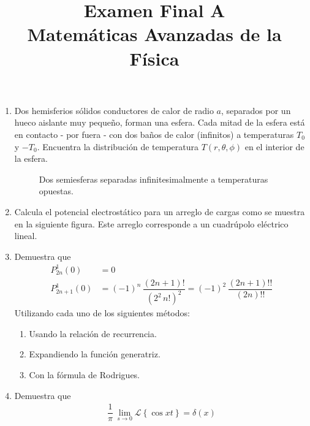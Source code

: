 
\author{}
\title{Examen Final A  \\ \large{Matemáticas Avanzadas de la Física}} \vspace{-1.5\baselineskip}
\date{ }

\vspace{-4cm}
\renewcommand\labelenumii{\theenumi.{\arabic{enumii})}}
\maketitle
\fontsize{14}{14}\selectfont
\begin{enumerate}
\item Dos hemisferios sólidos conductores de calor de radio $a$, separados por un hueco aislante muy pequeño, forman una esfera. Cada mitad de la esfera está en contacto - por fuera - con dos baños de calor (infinitos) a temperaturas $T_{0}$ y $-T_{0}$. Encuentra la distribución de temperatura $T (r, \theta, \phi)$ en el interior de la esfera.
\begin{figure}[H]
    \centering
    
    \caption{Dos semiesferas separadas infinitesimalmente a temperaturas opuestas.}
    \label{fig:figura2}
\end{figure}
\item Calcula el potencial electrostático para un arreglo de cargas como se muestra en la siguiente figura. Este arreglo corresponde a un cuadrúpolo eléctrico lineal.
\item Demuestra que
\begin{align*}
P_{2n}^{1} (0) &= 0 \\
P_{2n+1}^{1} (0) &= (-1)^{n} \, \dfrac{(2n + 1)!}{(2^{2} \, n!)^{2}} = (-1)^{2} \, \dfrac{(2n + 1)!!}{(2n)!!}
\end{align*}
Utilizando cada uno de los siguientes métodos:
\begin{enumerate}
\item Usando la relación de recurrencia.
\item Expandiendo la función generatriz.
\item Con la fórmula de Rodrigues.
\end{enumerate}
\item Demuestra que
\begin{align*}
\dfrac{1}{\pi} \, \lim_{s \to 0} \mathcal{L} \left\{ \cos x t \right\} = \delta (x)
\end{align*}
\end{enumerate}
